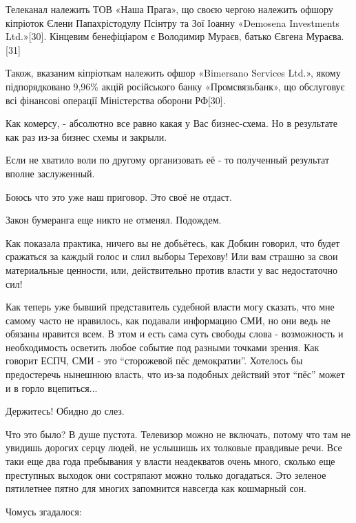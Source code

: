 \begin{itemize}
Телеканал належить ТОВ «Наша Прага», що своєю чергою належить офшору кіпріоток
Єлени Папахрістодулу Псінтру та Зої Іоанну «Demosena Investments Ltd.»[30].
Кінцевим бенефіціаром є Володимир Мураєв, батько Євгена Мураєва.[31]

Також, вказаним кіпріоткам належить офшор «Bimersano Services Ltd.», якому
підпорядковано 9,96\% акцій російського банку «Промсвязьбанк», що обслуговує
всі фінансові операції Міністерства оборони РФ[30].

Как комерсу, - абсолютно все равно какая у Вас бизнес-схема. Но в результате
как раз из-за бизнес схемы и закрыли.

Если не хватило воли по другому организовать её - то полученный результат
вполне заслуженный.

Боюсь что это уже наш приговор. Это своё не отдаст.

Закон бумеранга еще никто не отменял. Подождем.


Как показала практика, ничего вы не добьётесь, как Добкин говорил, что будет
сражаться за каждый голос и слил выборы Терехову! Или вам страшно за свои
материальные ценности, или, действительно против власти у вас недостаточно сил!


Как теперь уже бывший представитель судебной власти могу сказать, что мне
самому часто не нравилось, как подавали информацию СМИ, но они ведь не обязаны
нравится всем. В этом и есть сама суть свободы слова - возможность и
необходимость осветить любое событие под разными точками зрения. Как говорит
ЕСПЧ, СМИ - это \enquote{сторожевой пёс демократии}. Хотелось бы предостеречь нынешнюю
власть, что из-за подобных действий этот \enquote{пёс} может и в горло вцепиться...

Держитесь! Обидно до слез.


Что это было? В душе пустота. Телевизор можно не включать, потому что там не
увидишь дорогих серцу людей, не услышишь их толковые правдивые речи. Все таки
еще два года пребывания у власти неадекватов очень много, сколько еще
преступных выходок они состряпают можно только догадаться. Это зеленое
пятилетнее пятно для многих запомнится навсегда как кошмарный сон.


Чомусь згадалося:


\end{itemize}
